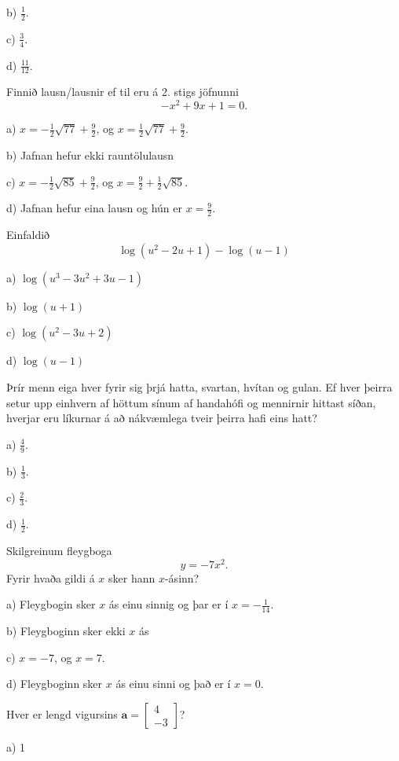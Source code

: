 b) $ \frac{1}{2}$.

c) $ \frac{3}{4}$.

d) $ \frac{11}{12}$.


\item Finnið lausn/lausnir ef til eru á 2. stigs jöfnunni $$- x^{2} + 9 x + 1=0.$$

a) $x = - \frac{1}{2} \sqrt{77} + \frac{9}{2}$, og $x=\frac{1}{2} \sqrt{77} + \frac{9}{2}$.

b) Jafnan hefur ekki rauntölulausn

c) $x = - \frac{1}{2} \sqrt{85} + \frac{9}{2}$, og $x=\frac{9}{2} + \frac{1}{2} \sqrt{85}$. %

d) Jafnan hefur eina lausn og hún er $x=\frac{9}{2}$.


\item Einfaldið
$$\log(u^2-2u+1)-\log(u-1)$$

a) $\log(u^3-3u^2+3u-1)$

b) $\log(u+1)$

c) $\log(u^2-3u+2)$

d) $\log(u-1)$ %


\item Þrír menn eiga hver fyrir sig þrjá hatta, svartan, hvítan og gulan. Ef hver þeirra setur upp einhvern af höttum sínum af handahófi og mennirnir hittast síðan, hverjar eru líkurnar á að nákvæmlega tveir þeirra hafi eins hatt?

a) $ \frac{4}{9}$.

b) $ \frac{1}{3}$.

c) $ \frac{2}{3}$. %

d) $ \frac{1}{2}$.


\item Skilgreinum fleygboga $$y=- 7 x^{2}.$$ Fyrir hvaða gildi á $x$ sker hann $x$-ásinn?

a) Fleygbogin sker $x$ ás einu sinnig og þar er í $x=- \frac{1}{14}$.

b) Fleygboginn sker ekki $x$ ás

c) $x=-7$, og $x=7$.

d) Fleygboginn sker $x$ ás einu sinni og það er í $x=0$. %


\item Hver er lengd vigursins $ \mathbf{a} =
\left[
\begin{matrix}
4\\
-3
\end{matrix}
\right]$?

a) 1

